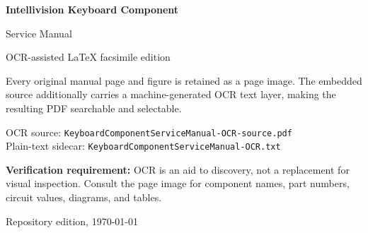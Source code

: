 \documentclass[letterpaper,11pt]{article}
\begin{document}
\begin{titlepage}
  \centering
  \vspace*{0.18\textheight}
  {\LARGE\bfseries Intellivision Keyboard Component\par}
  \vspace{0.4em}
  {\Large Service Manual\par}
  \vspace{1.5em}
  {\large OCR-assisted LaTeX facsimile edition\par}
  \vfill
  \begin{minipage}{0.82\textwidth}
    \small
    Every original manual page and figure is retained as a page image. The
    embedded source additionally carries a machine-generated OCR text layer,
    making the resulting PDF searchable and selectable.

    \medskip
    OCR source: \texttt{KeyboardComponentServiceManual-OCR-source.pdf}\\
    Plain-text sidecar: \texttt{KeyboardComponentServiceManual-OCR.txt}

    \medskip
    \textbf{Verification requirement:} OCR is an aid to discovery, not a
    replacement for visual inspection. Consult the page image for component
    names, part numbers, circuit values, diagrams, and tables.
  \end{minipage}
  \vfill
  {\small Repository edition, \today\par}
\end{titlepage}


\end{document}
